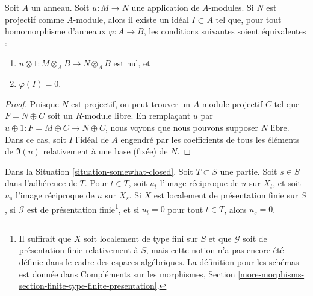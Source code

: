 \begin{lemma}
\label{lemma-F-zero-module-map}
Soit $A$ un anneau. Soit $u : M \to N$ une application de $A$-modules.
Si $N$ est projectif comme $A$-module, alors il existe un idéal
$I \subset A$ tel que, pour tout homomorphisme d'anneaux $\varphi : A \to B$,
les conditions suivantes soient équivalentes :
\begin{enumerate}
\item $u \otimes 1 : M \otimes_A B \to N \otimes_A B$ est nul, et
\item $\varphi(I) = 0$.
\end{enumerate}
\end{lemma}

\begin{proof}
Puisque $N$ est projectif, on peut trouver un $A$-module projectif $C$
tel que $F = N \oplus C$ soit un $R$-module libre.
En remplaçant $u$ par $u \oplus 1 : F = M \oplus C \to N \oplus C$,
nous voyons que nous pouvons supposer $N$ libre. Dans ce cas, soit $I$
l'idéal de $A$ engendré par les coefficients de tous les éléments de
$\Im(u)$ relativement à une base (fixée) de $N$.
\end{proof}

\begin{lemma}
\label{lemma-F-zero-somewhat-closed-points}
Dans la Situation \ref{situation-somewhat-closed}.
Soit $T \subset S$ une partie. Soit $s \in S$ dans l'adhérence de $T$.
Pour $t \in T$, soit $u_t$ l'image réciproque de $u$ sur $X_t$,
et soit $u_s$ l'image réciproque de $u$ sur $X_s$.
Si $X$ est localement de présentation finie sur $S$,
si $\mathcal{G}$ est de présentation finie\footnote{Il suffirait
que $X$ soit localement de type fini sur $S$
et que $\mathcal{G}$ soit de présentation finie relativement à $S$,
mais cette notion n'a pas encore été définie dans le cadre
des espaces algébriques. La définition pour les schémas est
donnée dans Compléments sur les morphismes, Section
\ref{more-morphisms-section-finite-type-finite-presentation}.}, et si
$u_t = 0$ pour tout $t \in T$, alors $u_s = 0$.
\end{lemma}

